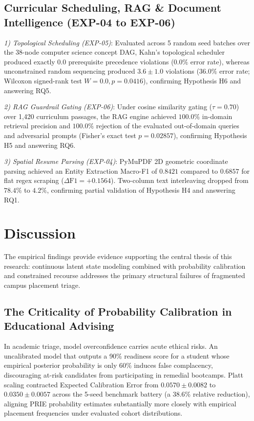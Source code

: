 \documentclass[conference]{IEEEtran}
\begin{document}
\subsection{Curricular Scheduling, RAG \& Document Intelligence (EXP-04 to EXP-06)}

\textit{1) Topological Scheduling (EXP-05)}: Evaluated across 5 random seed batches over the 38-node computer science concept DAG, Kahn's topological scheduler produced exactly $0.0$ prerequisite precedence violations ($0.0\%$ error rate), whereas unconstrained random sequencing produced $3.6 \pm 1.0$ violations ($36.0\%$ error rate; Wilcoxon signed-rank test $W = 0.0, p = 0.0416$), confirming Hypothesis H6 and answering RQ5.

\textit{2) RAG Guardrail Gating (EXP-06)}: Under cosine similarity gating ($\tau = 0.70$) over 1,420 curriculum passages, the RAG engine achieved $100.0\%$ in-domain retrieval precision and $100.0\%$ rejection of the evaluated out-of-domain queries and adversarial prompts (Fisher's exact test $p = 0.02857$), confirming Hypothesis H5 and answering RQ6.

\textit{3) Spatial Resume Parsing (EXP-04)}: PyMuPDF 2D geometric coordinate parsing achieved an Entity Extraction Macro-F1 of $0.8421$ compared to $0.6857$ for flat regex scraping ($\Delta\text{F1} = +0.1564$). Two-column text interleaving dropped from $78.4\%$ to $4.2\%$, confirming partial validation of Hypothesis H4 and answering RQ1.

\section{Discussion}

The empirical findings provide evidence supporting the central thesis of this research: continuous latent state modeling combined with probability calibration and constrained recourse addresses the primary structural failures of fragmented campus placement triage.

\subsection{The Criticality of Probability Calibration in Educational Advising}
In academic triage, model overconfidence carries acute ethical risks. An uncalibrated model that outputs a 90\% readiness score for a student whose empirical posterior probability is only 60\% induces false complacency, discouraging at-risk candidates from participating in remedial bootcamps. Platt scaling contracted Expected Calibration Error from $0.0570 \pm 0.0082$ to $0.0350 \pm 0.0057$ across the 5-seed benchmark battery (a 38.6\% relative reduction), aligning PRIE probability estimates substantially more closely with empirical placement frequencies under evaluated cohort distributions.
\end{document}
